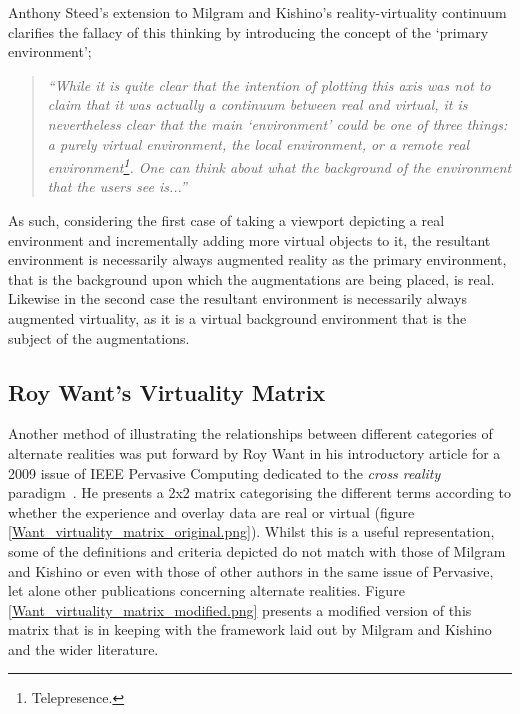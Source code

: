 Anthony Steed's extension to Milgram and Kishino's reality-virtuality continuum clarifies the fallacy of this thinking by introducing the concept of the `primary environment';

\begin{quote}
\textit{``While it is quite clear that the intention of plotting this axis was not to claim that it was actually a continuum between real and virtual, it is nevertheless clear that the main `environment' could be one of three things: a purely virtual environment, the local environment, or a remote real environment\footnote{Telepresence.}. One can think about what the background of the environment that the users see is...''}~\cite{Steed2014}
\end{quote}

As such, considering the first case of taking a viewport depicting a real environment and incrementally adding more virtual objects to it, the resultant environment is necessarily always augmented reality as the primary environment, that is the background upon which the augmentations are being placed, is real. Likewise in the second case the resultant environment is necessarily always augmented virtuality, as it is a virtual background environment that is the subject of the augmentations.


\subsection{Roy Want's Virtuality Matrix}

Another method of illustrating the relationships between different categories of alternate realities was put forward by Roy Want in his introductory article for a 2009 issue of IEEE Pervasive Computing dedicated to the \textit{cross reality} paradigm~\cite{Want2009}. He presents a 2x2 matrix categorising the different terms according to whether the experience and overlay data are real or virtual (figure \ref{Want_virtuality_matrix_original.png}). Whilst this is a useful representation, some of the definitions and criteria depicted do not match with those of Milgram and Kishino or even with those of other authors in the same issue of Pervasive, let alone other publications concerning alternate realities. Figure \ref{Want_virtuality_matrix_modified.png} presents a modified version of this matrix that is in keeping with the framework laid out by Milgram and Kishino and the wider literature.

